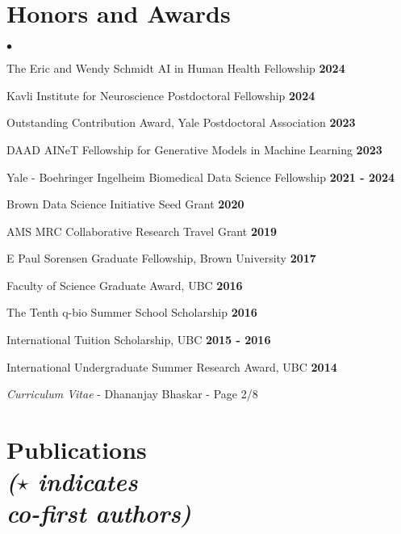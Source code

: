 \documentclass[margin,line]{res}
\newenvironment{list2}{
  \begin{list}{$\bullet$}{
      \setlength{\itemsep}{0in}
      \setlength{\parsep}{0in} \setlength{\parskip}{0in}
      \setlength{\topsep}{0in} \setlength{\partopsep}{0in}
      \setlength{\leftmargin}{0.2in}}}{\end{list}}
\begin{document}
\begin{resume}
\vspace*{.12cm}

\section{\sc Honors and Awards}
\begin{list2}
\setlength\itemsep{0.25em}
\item The Eric and Wendy Schmidt AI in Human Health Fellowship \hfill {\bf 2024}
\item Kavli Institute for Neuroscience Postdoctoral Fellowship \hfill {\bf 2024}
\item Outstanding Contribution Award, Yale Postdoctoral Association \hfill {\bf 2023}
\item DAAD AINeT Fellowship for Generative Models in Machine Learning \hfill {\bf 2023}
\item Yale - Boehringer Ingelheim Biomedical Data Science Fellowship \hfill {\bf 2021 - 2024}
\item Brown Data Science Initiative Seed Grant \hfill {\bf 2020}
\item AMS MRC Collaborative Research Travel Grant \hfill {\bf 2019}
\item E Paul Sorensen Graduate Fellowship, Brown University \hfill {\bf 2017}
\item Faculty of Science Graduate Award, UBC \hfill {\bf 2016}
\item The Tenth q-bio Summer School Scholarship \hfill {\bf 2016}
\item International Tuition Scholarship, UBC \hfill {\bf 2015 - 2016}
\item International Undergraduate Summer Research Award, UBC \hfill {\bf 2014}
\end{list2}

\newpage
\begin{flushright}
\textit{Curriculum Vitae} - Dhananjay Bhaskar - Page 2/8
\end{flushright}
\vspace*{.15cm}

\section{\sc Publications\\ \textit{{\small ($\star$ indicates \\ co-first authors)}}}
{
\renewcommand\leftmargini{0em}
\begin{etaremune}[start=20]


\end{etaremune}}
\end{resume}
\end{document}
